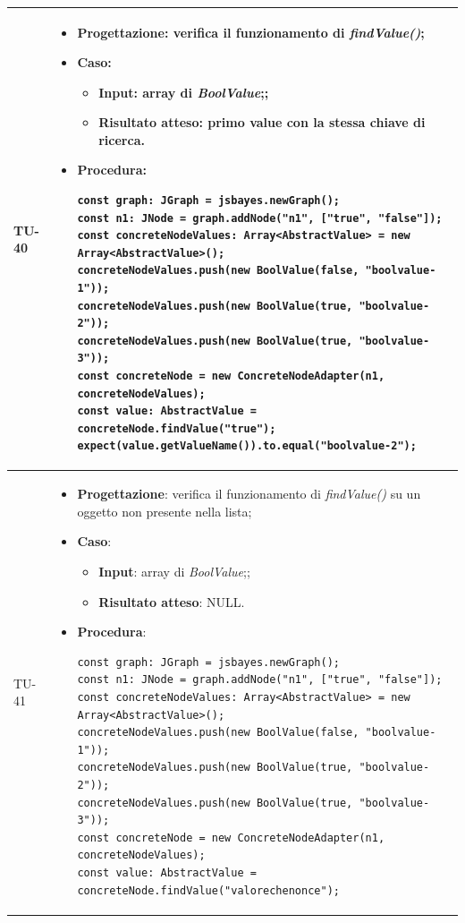 \begin{longtable}{|C{1.5cm}|C{14.5cm}|}
	\hline
	{TU-40} &
	\begin{itemize}
		\item \textbf{Progettazione}: verifica il funzionamento di \emph{findValue()};
		\item \textbf{Caso}: 
		\begin{itemize}
			\item \textbf{Input}: array di \emph{BoolValue};;
			\item \textbf{Risultato atteso}: primo value con la stessa chiave di ricerca.
		\end{itemize}
		\item \textbf{Procedura}:
		\begin{lstlisting}
const graph: JGraph = jsbayes.newGraph();
const n1: JNode = graph.addNode("n1", ["true", "false"]);
const concreteNodeValues: Array<AbstractValue> = new Array<AbstractValue>();
concreteNodeValues.push(new BoolValue(false, "boolvalue-1"));
concreteNodeValues.push(new BoolValue(true, "boolvalue-2"));
concreteNodeValues.push(new BoolValue(true, "boolvalue-3"));
const concreteNode = new ConcreteNodeAdapter(n1, concreteNodeValues);
const value: AbstractValue = concreteNode.findValue("true");
expect(value.getValueName()).to.equal("boolvalue-2");
		\end{lstlisting}
	\end{itemize}\\
	\hline
	{TU-41} &
	\begin{itemize}
		\item \textbf{Progettazione}: verifica il funzionamento di \emph{findValue()} su un oggetto non presente nella lista;
		\item \textbf{Caso}: 
		\begin{itemize}
			\item \textbf{Input}: array di \emph{BoolValue};;
			\item \textbf{Risultato atteso}: NULL.
		\end{itemize}
		\item \textbf{Procedura}:
		\begin{lstlisting}
const graph: JGraph = jsbayes.newGraph();
const n1: JNode = graph.addNode("n1", ["true", "false"]);
const concreteNodeValues: Array<AbstractValue> = new Array<AbstractValue>();
concreteNodeValues.push(new BoolValue(false, "boolvalue-1"));
concreteNodeValues.push(new BoolValue(true, "boolvalue-2"));
concreteNodeValues.push(new BoolValue(true, "boolvalue-3"));
const concreteNode = new ConcreteNodeAdapter(n1, concreteNodeValues);
const value: AbstractValue = concreteNode.findValue("valorechenonce");

\end{lstlisting}
\end{itemize}
\end{longtable}

